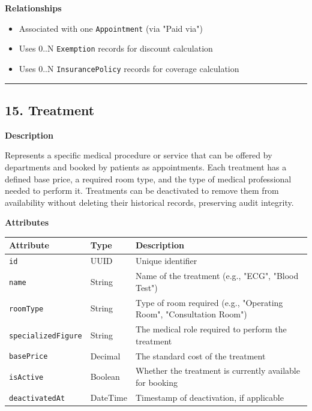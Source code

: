 \documentclass[12pt, a4paper]{article}
\begin{document}
\textbf{Relationships}

\begin{itemize}
    \item Associated with one \texttt{Appointment} (via "Paid via")
    \item Uses 0..N \texttt{Exemption} records for discount calculation
    \item Uses 0..N \texttt{InsurancePolicy} records for coverage calculation
\end{itemize}

\par\medskip\hrule\medskip

\subsection{15. Treatment}\label{sec:15-treatment}

\textbf{Description}

Represents a specific medical procedure or service that can be offered by departments and booked by patients as appointments. Each treatment has a defined base price, a required room type, and the type of medical professional needed to perform it. Treatments can be deactivated to remove them from availability without deleting their historical records, preserving audit integrity.

\textbf{Attributes}

\begin{center}
\small
\renewcommand{\arraystretch}{1.35}
\begin{tabularx}{\textwidth}{|>{\raggedright\arraybackslash}p{3.4cm}|>{\raggedright\arraybackslash}p{3.3cm}|Y|}
\hline
{}
\textbf{Attribute} & \textbf{Type} & \textbf{Description} \\ \hline
\texttt{id} & UUID & Unique identifier \\ \hline
\texttt{name} & String & Name of the treatment (e.g., "ECG", "Blood Test") \\ \hline
\texttt{roomType} & String & Type of room required (e.g., "Operating Room", "Consultation Room") \\ \hline
\texttt{specializedFigure} & String & The medical role required to perform the treatment \\ \hline
\texttt{basePrice} & Decimal & The standard cost of the treatment \\ \hline
\texttt{isActive} & Boolean & Whether the treatment is currently available for booking \\ \hline
\texttt{deactivatedAt} & DateTime & Timestamp of deactivation, if applicable \\ \hline
\end{tabularx}
\end{center}
\end{document}

